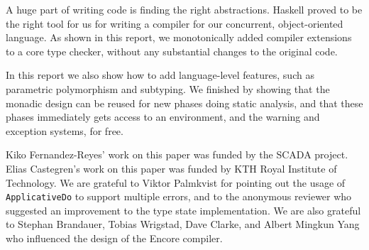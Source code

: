 \documentclass[sigplan,screen]{acmart}
\makeatletter
\newcommand{\ec}[1]{\lstinline[style=encore,breaklines=true,basicstyle=\fontsize{9}{9}\tt]@#1@}
\makeatother
\begin{document}
A huge part of writing code is finding the right abstractions.
Haskell proved to be the right tool for us for writing a compiler
for our concurrent, object-oriented language.
As shown in this report, we monotonically added compiler extensions
to a core type checker, without any substantial changes to the original code.

In this report we also show how to add language-level features,
such as parametric polymorphism and subtyping. We finished by
showing that the monadic design can be reused for new phases doing
static analysis, and that these phases immediately gets access to
an environment, and the warning and exception systems, for free.

%

\begin{acks}
  Kiko Fernandez-Reyes' work on this paper was funded by the SCADA
  project. Elias Castegren's work on this paper was funded by KTH
  Royal Institute of Technology. We are grateful to Viktor
  Palmkvist for pointing out the usage of \ec{ApplicativeDo} to
  support multiple errors, and to the anonymous reviewer who
  suggested an improvement to the type state implementation. We
  are also grateful to Stephan Brandauer, Tobias Wrigstad, Dave
  Clarke, and Albert Mingkun Yang who influenced the design of the
  Encore compiler.
\end{acks}
\end{document}
